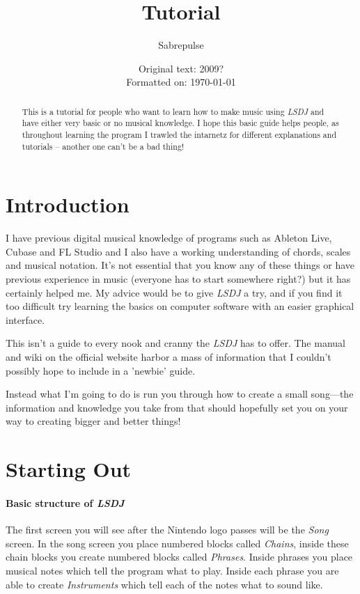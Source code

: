 \documentclass[]{article}
\title{\lsdj Tutorial}
\author{Sabrepulse}
\date{Original text: 2009? \\ Formatted on: \today}
\newcommand{\lsdj}{\textit{LSDJ}\xspace}
\begin{document}
\maketitle

\begin{abstract}
This is a tutorial for people who want to learn how to make music using \lsdj and have either very basic or no musical knowledge. I hope this basic guide helps people, as throughout learning the program I trawled the intarnetz for different explanations and tutorials – another one can't be a bad thing!
\end{abstract}


\tableofcontents

\section{Introduction}



I have previous digital musical knowledge of programs such as Ableton Live, Cubase and FL Studio and I also have a working understanding of chords, scales and musical notation. It's not essential that you know any of these things or have previous experience in music (everyone has to start somewhere right?) but it has certainly helped me. My advice would be to give \lsdj a try, and if you find it too difficult try learning the basics on computer software with an easier graphical interface.

This isn't a guide to every nook and cranny the \lsdj has to offer. The manual and wiki on the official website harbor a mass of information that I couldn't possibly hope to include in a 'newbie' guide.

Instead what I'm going to do is run you through how to create a small song---the information and knowledge you take from that should hopefully set you on your way to creating bigger and better things!

\section{Starting Out}



\paragraph{Basic structure of \lsdj}

The first screen you will see after the Nintendo logo passes will be the \textit{Song} screen.
%
In the song screen you place numbered blocks called \textit{Chains}, inside these chain blocks you create numbered blocks called \textit{Phrases}. Inside phrases you place musical notes which tell the program what to play. Inside each phrase you are able to create \textit{Instruments} which tell each of the notes what to sound like.
\end{document}
